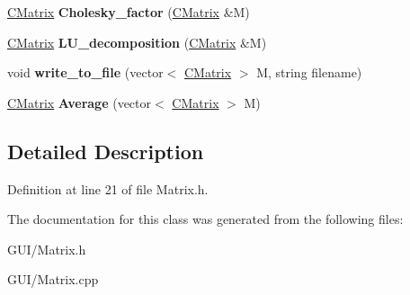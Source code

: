 \begin{DoxyCompactItemize}
\mbox{\label{class_c_matrix_a3f428b8b3fdf12ebcc8e9a6af3673f7b}} 
\hyperlink{class_c_matrix}{C\+Matrix} {\bfseries Cholesky\+\_\+factor} (\hyperlink{class_c_matrix}{C\+Matrix} \&M)
\item 
\mbox{\label{class_c_matrix_a1df66bf9365f6ca1ba60e6a372517e3b}} 
\hyperlink{class_c_matrix}{C\+Matrix} {\bfseries L\+U\+\_\+decomposition} (\hyperlink{class_c_matrix}{C\+Matrix} \&M)
\item 
\mbox{\label{class_c_matrix_ae67463512ec8fb59b673e3e57ae0dc47}} 
void {\bfseries write\+\_\+to\+\_\+file} (vector$<$ \hyperlink{class_c_matrix}{C\+Matrix} $>$ M, string filename)
\item 
\mbox{\label{class_c_matrix_a5a05dbfeabdf14411939273b43afb51b}} 
\hyperlink{class_c_matrix}{C\+Matrix} {\bfseries Average} (vector$<$ \hyperlink{class_c_matrix}{C\+Matrix} $>$ M)
\end{DoxyCompactItemize}


\subsection{Detailed Description}


Definition at line 21 of file Matrix.\+h.



The documentation for this class was generated from the following files\+:\begin{DoxyCompactItemize}
\item 
G\+U\+I/Matrix.\+h\item 
G\+U\+I/Matrix.\+cpp\end{DoxyCompactItemize}
